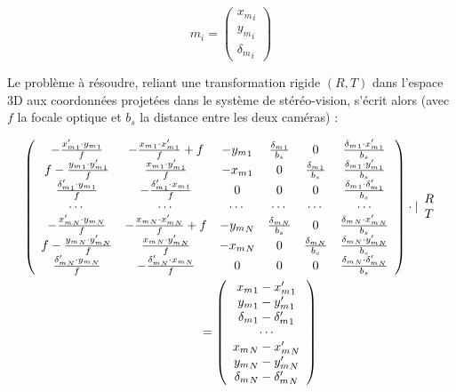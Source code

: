 \begin{equation}
	m_i = \left(  
		\begin{array}{c} 
			{x_m}_i		 \\ 
			 {y_m}_i	 \\ 
			{\delta_m}_i
		\end{array}
		\right) 
\end{equation}

Le problème à résoudre, reliant une transformation rigide $(R, T)$ dans l'espace 3D aux coordonnées projetées dans le système de stéréo-vision, s'écrit alors (avec $f$ la focale optique et $b_s$ la distance entre les deux caméras) :

\begin{align}
	\begin{split}
		&\left(
			\begin{array}{cccccc}
				-\frac{{x_m'}_1 \cdot {y_m}_1}{f} 		& -\frac{{x_m}_1 \cdot {x_m'}_1}{f} +f 	& -{y_m}_1 	& \frac{{\delta_m}_1}{b_s} & 0 & \frac{{\delta_m}_1 \cdot {x_m'}_1}{b_s}\\ 
				f -\frac{{y_m}_1 \cdot {y_m'}_1}{f} 	& \frac{{x_m}_1 \cdot {y_m'}_1}{f} 		& -{x_m}_1 	& 0 & \frac{{\delta_m}_1}{b_s} & \frac{{\delta_m}_1 \cdot {y_m'}_1}{b_s}\\ 
				\frac{{\delta'_m}_1 \cdot {y_m}_1}{f} 	& -\frac{{\delta_m'}_1 \cdot {x_m}_1}{f} & 0 & 0 & 0 & \frac{{\delta_m}_1 \cdot {\delta_m'}_1}{b_s}\\ 
				\cdots 									& \cdots 								& \cdots 	& \cdots 	& \cdots 	& \cdots\\ 
				-\frac{{x_m'}_N \cdot {y_m}_N}{f} 		& -\frac{{x_m}_N \cdot {x_m'}_N}{f} +f 	& -{y_m}_N 	& \frac{{\delta_m}_N}{b_s} & 0 & \frac{{\delta_m}_N \cdot {x_m'}_N}{b_s}\\ 
				f -\frac{{y_m}_N \cdot {y_m'}_N}{f} 	& \frac{{x_m}_N \cdot {y_m'}_N}{f} 		& -{x_m}_N 	& 0 & \frac{{\delta_m}_N}{b_s} & \frac{{\delta_m}_N \cdot {y_m'}_N}{b_s}\\ 
				\frac{{\delta'_m}_N \cdot {y_m}_N}{f} 	& -\frac{{\delta_m'}_N \cdot {x_m}_N}{f} & 0 & 0 & 0 & \frac{{\delta_m}_N \cdot {\delta_m'}_N}{b_s}
			\end{array} 
		\right) 
		\cdot  \lvert {
		\begin{array}{c}
			R\\ 
	 		T
		\end{array}
		} \\
		& \hspace*{5cm} = \left( {
		\begin{array}{c}
			{x_m}_1-{x_m'}_1			\\
			{y_m}_1-{y_m'}_1			\\
			{\delta_m}_1-{\delta_m'}_1	\\
			\cdots 						\\
			{x_m}_N-{x_m'}_N			\\
			{y_m}_N-{y_m'}_N			\\
			{\delta_m}_N-{\delta_m'}_N
		\end{array} }
		\right)
	\end{split}
\end{align}

